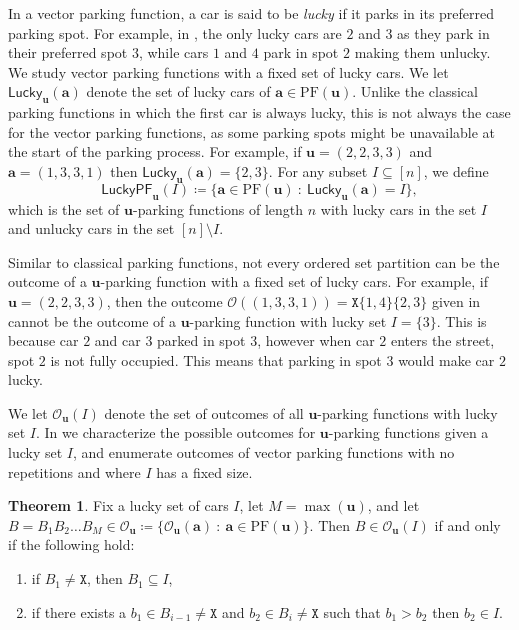 \documentclass[reqno]{amsart}
\newcommand{\X}{\texttt{X}}
\def\O{\mathcal{O}}
\newcommand{\LPF}{\mathsf{LuckyPF}}
\newcommand{\PF}{\mathrm{PF}}
\newcommand{\Lucky}{\mathsf{Lucky}}
\theoremstyle{definition}
\newtheorem{theorem}{Theorem}[section]
\theoremstyle{remark}
\newcommand{\out}{\mathcal{O}}
\newcommand{\bsy}{\boldsymbol}
\begin{document}
In a vector parking function, a car is said to be \emph{lucky} if it parks in its preferred parking spot. For example, in , the only lucky cars are $2$ and $3$ as they park in their preferred spot $3$, while cars $1$ and $4$ park in spot $2$ making them unlucky. 
We study vector parking functions with a fixed set of lucky cars. We let $\Lucky_{\bsy{u}}(\bsy{a})$ denote the set of lucky cars of $\bsy{a} \in \PF(\bsy{u})$. Unlike the classical parking functions in which the first car is always lucky, this is not always the case for the vector parking functions, as some parking spots might be unavailable at the start of the parking process. For example, if $\bsy{u}=(2,2,3,3)$ and $\bsy{a}=(1,3,3,1)$ then $\Lucky_{\bsy{u}}(\bsy{a})=\{2,3\}$. For any subset $I\subseteq[n]$, we define
\[\LPF_{\bsy{u}}(I)\coloneqq\{\bsy{a}\in \PF(\bsy{u})~:~ \Lucky_{\bsy{u}}(\bsy{a})=I\},\]
which is the set of $\bsy{u}$-parking functions of length $n$ with lucky cars in the set $I$ and unlucky cars in the set $[n]\setminus I$.


Similar to classical parking functions, not every ordered set partition can be the outcome of a $\bsy{u}$-parking function with a fixed set of lucky cars. For example, if $\bsy{u}=(2,2,3,3)$, then the outcome $\out((1,3,3,1))=\X\{1,4\}\{2,3\}$ given in  cannot be the outcome of a $\bsy{u}$-parking function with lucky set $I=\{3\}$. This is because car $2$ and car $3$ parked in spot $3$, however when car $2$ enters the street, spot $2$ is not fully occupied. 
This means that parking in spot $3$ would make car $2$ lucky. 

We let $\out_{\bsy{u}}(I)$ denote the set of outcomes of all $\bsy{u}$-parking functions with lucky set $I$. 
In  we  characterize the possible outcomes for $\bsy u$-parking functions given a lucky set $I$, and enumerate outcomes of vector parking functions with no repetitions and where $I$ has a fixed size. 

\setcounter{section}{3} 
\setcounter{theorem}{6}
\begin{theorem}
Fix a lucky set of cars $I$, let $M=\max{(\bsy{u})}$, and let $B=B_1B_2\ldots B_M\in \O_{\bsy{u}}
\coloneqq\{\out_{\bsy{u}}(\bsy{a})~:~\bsy{a}\in\PF(\bsy{u})\}$.
Then $B \in \O_{\bsy{u}}(I)$ 
if and only if the following hold:
\begin{enumerate}
    \item if $B_1\neq \X$, then $B_1\subseteq I$,
    \item if there exists a $b_1\in B_{i-1}\neq \X$ and $b_2\in B_{i}\neq \X$ such that $b_1>b_2$ then $b_2\in I$.
\end{enumerate}
\end{theorem}
\end{document}
